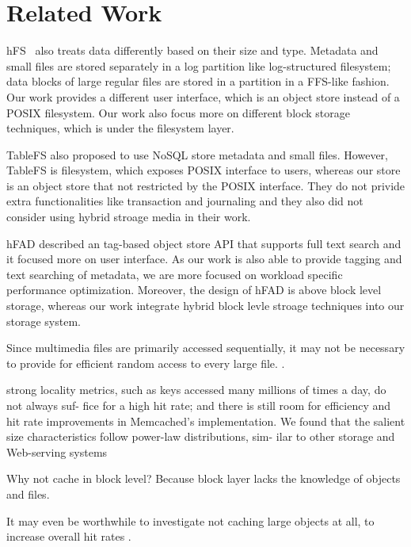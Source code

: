 \section{Related Work} 
\label{sec:related} 

hFS~\cite{eurosys_hfs} also treats data differently based on their size and
type. Metadata and small files are stored separately in a log partition like
log-structured filesystem; data blocks of large regular files are stored in a
partition in a FFS-like fashion. Our work provides a different user interface,
which is an object store instead of a POSIX filesystem. Our work also focus
more on different block storage techniques, which is under the filesystem
layer.


TableFS \cite{tablefs} also proposed to use NoSQL store metadata and small
files. However, TableFS is filesystem, which exposes POSIX interface to users,
whereas our store is an object store that not restricted by the POSIX
interface.  They do not privide extra functionalities like transaction and
journaling and they also did not consider using hybrid stroage media in their
work.

hFAD \cite{Seltzer09hfad} described an tag-based object store API that supports
full text search and it focused more on user interface. As our work is also
able to provide tagging and text searching of metadata, we are more focused on
workload specific performance optimization. Moreover, the design of hFAD is
above block level storage, whereas our work integrate hybrid block levle
stroage techniques into our storage system.

Since multimedia files are primarily accessed sequentially, it may not be
necessary to provide for efficient random access to every large file.
\cite{evans2002study}.

\cite{kvworkload_sigmetrics} strong locality metrics, such as keys accessed many
millions of times a day, do not always suf- fice for a high hit rate; and there
is still room for efficiency and hit rate improvements in Memcached’s
implementation.  We found that the salient size characteristics follow
power-law distributions, sim- ilar to other storage and Web-serving systems

Why not cache in block level? Because block layer lacks the knowledge of
objects and files.  

It may even be worthwhile to investigate not caching large objects at all, to
increase overall hit rates \cite{kvworkload_sigmetrics}.

